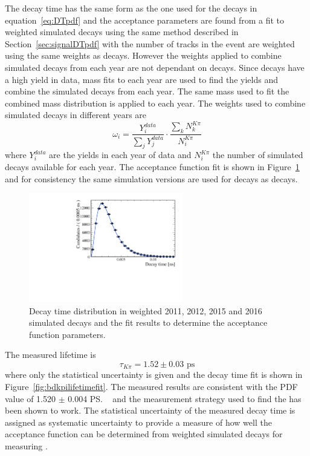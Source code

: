 The decay time \pdf has the same form as the one used for the \bsmumu decays in equation~\ref{eq:DTpdf} and the acceptance parameters are found from a fit to weighted \bdkpi simulated decays using the same method described in Section~\ref{sec:signalDTpdf} with the number of tracks in the event are weighted using the same weights as \bsmumu decays. However the weights applied to combine simulated \bdkpi decays from each year are not dependant on \bsjpsiphi decays. Since \bdkpi decays have a high yield in data, mass fits to each year are used to find the yields and combine the simulated decays from each year. The same mass \pdf used to fit the combined mass distribution is applied to each year. The weights used to combine simulated decays in different years are
\begin{equation}
\omega_{i}  = \frac{Y_{i}^{data}}{\displaystyle\sum_{j} Y_{j}^{data}} \cdot \frac{\displaystyle\sum_{k} N_{k}^{K\pi}}{N_{i}^{K\pi}}
\end{equation}
where $Y_{i}^{data}$ are the \bdkpi yields in each year of data and $N_{i}^{K\pi}$ the number of simulated decays available for each year.
The acceptance function fit is shown in Figure~\ref{fig:bdkpiacceptancefit} and for consistency the same simulation versions are used for \bdkpi decays as \bsmumu decays. 

\begin{figure}[htbp]
\centering
  \includegraphics[width=0.6\textwidth]{./Figs/LifetimeSystematics/Bd2KPi_acceptance_fit.pdf}
\caption{Decay time distribution in weighted 2011, 2012, 2015 and 2016 simulated decays and the \ml fit results to determine the acceptance function parameters. }
\label{fig:bdkpiacceptancefit}
\end{figure}

The measured \bdkpi lifetime is
\begin{equation}
\tau_{K\pi} = 1.52 \pm 0.03  \text{ ps} 
\end{equation}
where only the statistical uncertainty is given and the decay time fit is shown in Figure~\ref{fig:bdkpilifetimefit}. The measured results are consistent with the PDF value of 1.520 $\pm$ 0.004 \ps~\cite{Olive:2016xmw} and the measurement strategy used to find the \bsmumu \el has been shown to work. The statistical uncertainty of the measured \bdkpi decay time is assigned as systematic uncertainty to provide a measure of how well the acceptance function can be determined from weighted simulated decays for measuring \tmumu. 

